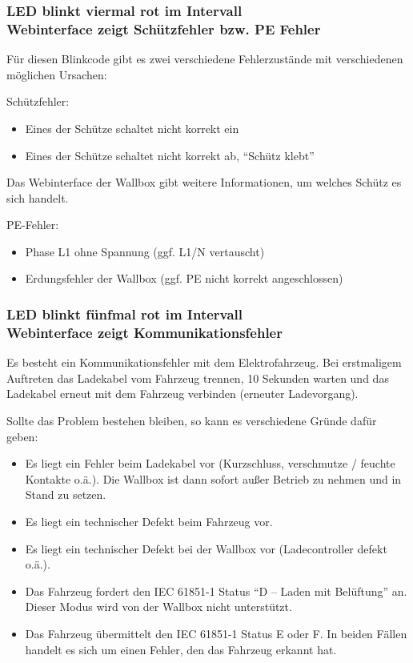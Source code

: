 \documentclass[a4paper,10pt]{article}
\begin{document}
\begin{multicols*}{2}
    \subsubsection*{LED blinkt viermal rot im Intervall \\ Webinterface zeigt Schützfehler bzw. PE Fehler}
    Für diesen Blinkcode gibt es zwei verschiedene Fehlerzustände mit
	verschiedenen möglichen Ursachen:

	Schützfehler:
	    \begin{itemize}
        \item Eines der Schütze schaltet nicht korrekt ein
        \item Eines der Schütze schaltet nicht korrekt ab, \enquote{Schütz klebt}
    \end{itemize}
	Das Webinterface der Wallbox gibt weitere Informationen, um welches Schütz es
	sich handelt.

	PE-Fehler:
    \begin{itemize}
        \item Phase L1 ohne Spannung (ggf. L1/N vertauscht)
        \item Erdungsfehler der Wallbox (ggf. PE nicht korrekt angeschlossen)
    \end{itemize}

    \subsubsection*{LED blinkt fünfmal rot im Intervall \\ Webinterface zeigt Kommunikationsfehler}
    Es besteht ein Kommunikationsfehler mit dem Elektrofahrzeug. Bei erstmaligem
    Auftreten das Ladekabel vom Fahrzeug trennen, 10 Sekunden warten und das
    Ladekabel erneut mit dem Fahrzeug verbinden (erneuter Ladevorgang).

    Sollte das Problem bestehen bleiben, so kann es verschiedene Gründe dafür
    geben:
    \begin{itemize}
        \item Es liegt ein Fehler beim Ladekabel vor (Kurzschluss, verschmutze / feuchte
              Kontakte o.ä.). Die Wallbox ist dann sofort außer Betrieb zu nehmen und
              in Stand zu setzen.
        \item Es liegt ein technischer Defekt beim Fahrzeug vor.
        \item Es liegt ein technischer Defekt bei der Wallbox vor
			(Ladecontroller defekt o.ä.).
        \item Das Fahrzeug fordert den IEC 61851-1 Status \enquote{D – Laden mit Belüftung}
              an. Dieser Modus wird von der Wallbox nicht unterstützt.
        \item Das Fahrzeug übermittelt den IEC 61851-1 Status E oder F. In beiden Fällen
              handelt es sich um einen Fehler, den das Fahrzeug erkannt hat.
    \end{itemize}


\end{multicols*}
\end{document}
